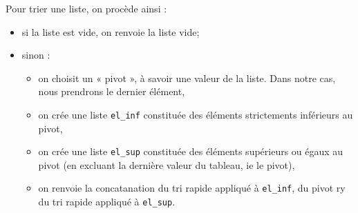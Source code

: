 %
%
%

 Pour trier une liste, on procède ainsi :
\begin{itemize}
\item si la liste est vide, on renvoie la liste vide;
\item sinon :
\begin{itemize}
\item on choisit un « pivot », à savoir une valeur de la liste. Dans notre cas, nous prendrons le dernier élément,
\item on crée une liste \texttt{el\_inf} constituée des éléments strictements inférieurs au pivot,
\item on crée une liste \texttt{el\_sup} constituée des éléments supérieurs ou égaux au pivot (en excluant la dernière valeur du tableau, ie le pivot),
\item on renvoie la concatanation du tri rapide appliqué à \texttt{el\_inf}, du pivot ry du tri rapide appliqué à \texttt{el\_sup}.
\end{itemize}
\end{itemize}

